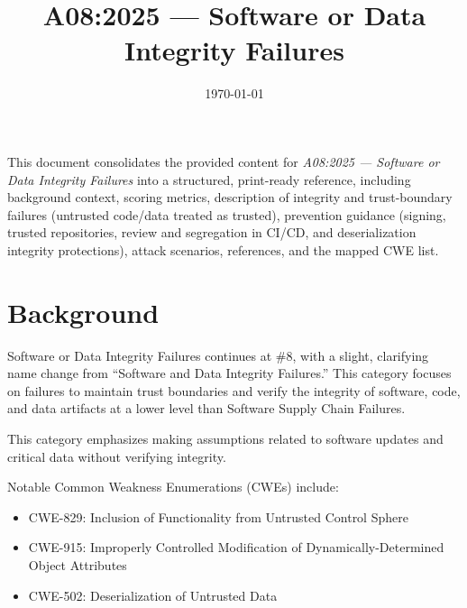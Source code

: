 \documentclass[11pt]{article}
\title{\textbf{A08:2025 — Software or Data Integrity Failures}}
\date{\today}
\author{} %
\begin{document}
\maketitle

\begin{infobox}
This document consolidates the provided content for \textit{A08:2025 — Software or Data Integrity Failures} into a structured, print-ready reference, including background context, scoring metrics, description of integrity and trust-boundary failures (untrusted code/data treated as trusted), prevention guidance (signing, trusted repositories, review and segregation in CI/CD, and deserialization integrity protections), attack scenarios, references, and the mapped CWE list.
\end{infobox}

\tableofcontents
\newpage

\section{Background}
Software or Data Integrity Failures continues at \#8, with a slight, clarifying name change from ``Software and Data Integrity Failures.'' This category focuses on failures to maintain trust boundaries and verify the integrity of software, code, and data artifacts at a lower level than Software Supply Chain Failures.

This category emphasizes making assumptions related to software updates and critical data without verifying integrity.

Notable Common Weakness Enumerations (CWEs) include:
\begin{itemize}
  \item CWE-829: Inclusion of Functionality from Untrusted Control Sphere
  \item CWE-915: Improperly Controlled Modification of Dynamically-Determined Object Attributes
  \item CWE-502: Deserialization of Untrusted Data
\end{itemize}
\end{document}
